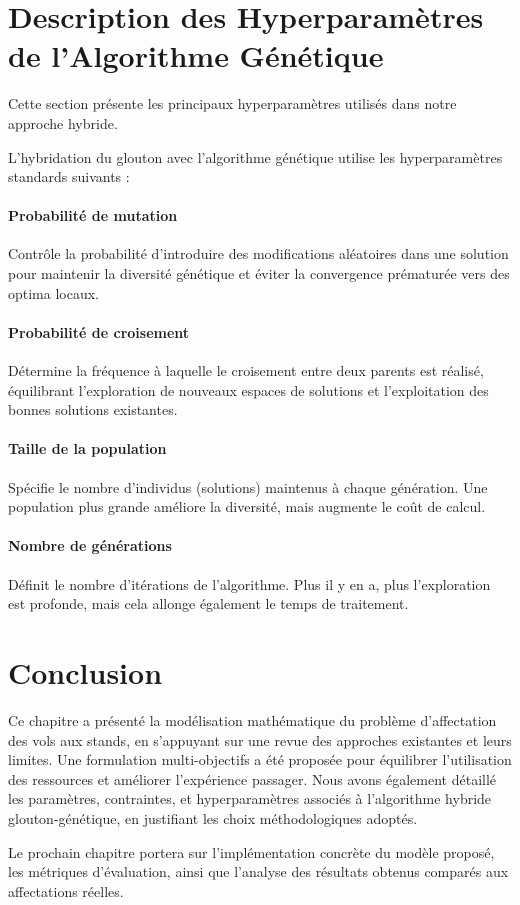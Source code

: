 
\section{Description des Hyperparamètres de l’Algorithme Génétique}
Cette section présente les principaux hyperparamètres utilisés dans notre approche hybride.

L’hybridation du glouton avec l’algorithme génétique utilise les hyperparamètres standards suivants :

\paragraph{Probabilité de mutation} Contrôle la probabilité d’introduire des modifications aléatoires dans une solution pour maintenir la diversité génétique et éviter la convergence prématurée vers des optima locaux.

\paragraph{Probabilité de croisement} Détermine la fréquence à laquelle le croisement entre deux parents est réalisé, équilibrant l’exploration de nouveaux espaces de solutions et l’exploitation des bonnes solutions existantes.

\paragraph{Taille de la population} Spécifie le nombre d’individus (solutions) maintenus à chaque génération. Une population plus grande améliore la diversité, mais augmente le coût de calcul.

\paragraph{Nombre de générations} Définit le nombre d’itérations de l’algorithme. Plus il y en a, plus l’exploration est profonde, mais cela allonge également le temps de traitement.

\section{Conclusion}
Ce chapitre a présenté la modélisation mathématique du problème d'affectation des vols aux stands, en s'appuyant sur une revue des approches existantes et leurs limites. Une formulation multi-objectifs a été proposée pour équilibrer l'utilisation des ressources et améliorer l'expérience passager. Nous avons également détaillé les paramètres, contraintes, et hyperparamètres associés à l’algorithme hybride glouton-génétique, en justifiant les choix méthodologiques adoptés.

Le prochain chapitre portera sur l’implémentation concrète du modèle proposé, les métriques d’évaluation, ainsi que l’analyse des résultats obtenus comparés aux affectations réelles.